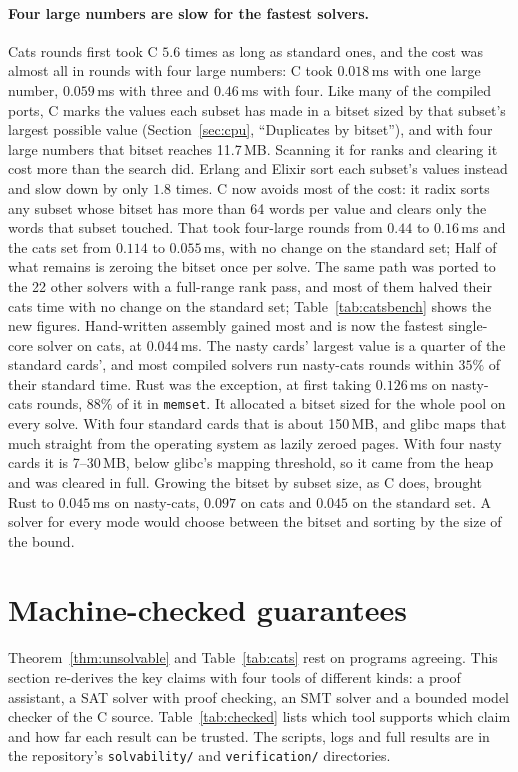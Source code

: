 \documentclass[11pt,a4paper]{article}
\theoremstyle{definition}
\theoremstyle{remark}
\begin{document}
\paragraph{Four large numbers are slow for the fastest solvers.}
Cats rounds first took C $5.6$ times as long as standard ones, and the cost was almost all in rounds with four
large numbers: C took $0.018$\,ms with one large number, $0.059$\,ms with three and $0.46$\,ms with four.
Like many of the compiled ports, C marks the values each subset has made in a bitset sized by that
subset's largest possible value (Section~\ref{sec:cpu}, ``Duplicates by bitset''), and with four large numbers
that bitset reaches 11.7\,MB. Scanning it for ranks and clearing it cost more than the search did. Erlang and Elixir sort each
subset's values instead and slow down by only $1.8$ times. C now avoids most of the cost: it radix sorts any subset whose bitset has more than 64 words per value and clears only the words that subset touched. That took four-large rounds from $0.44$ to $0.16$\,ms and the cats set from $0.114$ to $0.055$\,ms, with no change on the standard set; Half of what remains is zeroing the bitset once per solve. The same path was ported to the 22 other solvers with a full-range rank pass, and most of them halved their cats time with no change on the standard set; Table~\ref{tab:catsbench} shows the new figures. Hand-written assembly gained most and is now the fastest single-core solver on cats, at $0.044$\,ms. The nasty cards' largest value is a quarter of the standard cards', and most compiled
solvers run nasty-cats rounds within $35\%$ of their standard time. Rust was the exception, at first taking $0.126$\,ms on nasty-cats rounds, $88\%$ of it in \texttt{memset}. It allocated a bitset sized for the whole pool on every solve. With four standard cards that is about 150\,MB, and glibc maps that much straight from the operating system as lazily zeroed pages. With four nasty cards it is 7--30\,MB, below glibc's mapping threshold, so it came from the heap and was cleared in full. Growing the bitset by subset size, as C does, brought Rust to $0.045$\,ms on nasty-cats, $0.097$ on cats and $0.045$ on the standard set. A solver for every mode would choose
between the bitset and sorting by the size of the bound.

\section{Machine-checked guarantees}\label{sec:checked}

Theorem~\ref{thm:unsolvable} and Table~\ref{tab:cats} rest on programs agreeing. This section re-derives
the key claims with four tools of different kinds: a proof assistant, a SAT solver with proof checking, an
SMT solver and a bounded model checker of the C source. Table~\ref{tab:checked} lists which tool supports
which claim and how far each result can be trusted. The scripts, logs and full results are in the
repository's \texttt{solvability/} and \texttt{verification/} directories.
\end{document}
